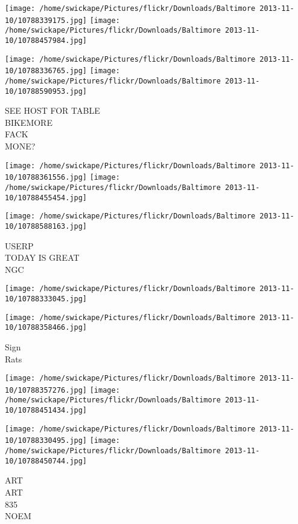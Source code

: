 \documentclass[10pt,letterpaper]{article}
\begin{document}
\texttt{[image: /home/swickape/Pictures/flickr/Downloads/Baltimore 2013-11-10/10788339175.jpg]}
\texttt{[image: /home/swickape/Pictures/flickr/Downloads/Baltimore 2013-11-10/10788457984.jpg]}

\texttt{[image: /home/swickape/Pictures/flickr/Downloads/Baltimore 2013-11-10/10788336765.jpg]}
\texttt{[image: /home/swickape/Pictures/flickr/Downloads/Baltimore 2013-11-10/10788590953.jpg]}

SEE HOST FOR TABLE\\
BIKEMORE\\
FACK\\
MONE?\\
\pagebreak

\texttt{[image: /home/swickape/Pictures/flickr/Downloads/Baltimore 2013-11-10/10788361556.jpg]}
\texttt{[image: /home/swickape/Pictures/flickr/Downloads/Baltimore 2013-11-10/10788455454.jpg]}

\vspace{0.25in}
\texttt{[image: /home/swickape/Pictures/flickr/Downloads/Baltimore 2013-11-10/10788588163.jpg]}

USERP\\
TODAY IS GREAT\\
NGC\\
\pagebreak

\texttt{[image: /home/swickape/Pictures/flickr/Downloads/Baltimore 2013-11-10/10788333045.jpg]}

\vspace{0.25in}
\texttt{[image: /home/swickape/Pictures/flickr/Downloads/Baltimore 2013-11-10/10788358466.jpg]}

Sign\\
Rats\\
\pagebreak

\texttt{[image: /home/swickape/Pictures/flickr/Downloads/Baltimore 2013-11-10/10788357276.jpg]}
\texttt{[image: /home/swickape/Pictures/flickr/Downloads/Baltimore 2013-11-10/10788451434.jpg]}

\texttt{[image: /home/swickape/Pictures/flickr/Downloads/Baltimore 2013-11-10/10788330495.jpg]}
\texttt{[image: /home/swickape/Pictures/flickr/Downloads/Baltimore 2013-11-10/10788450744.jpg]}

ART\\
ART\\
835\\
NOEM\\
\pagebreak
\end{document}
